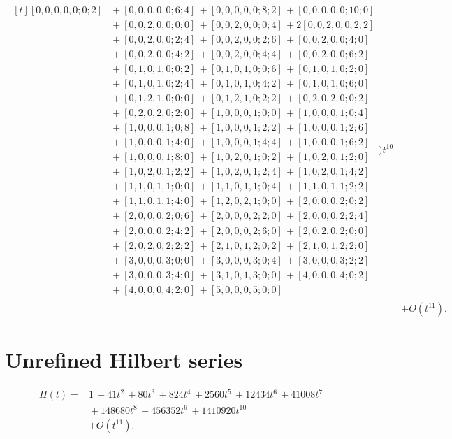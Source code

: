 \documentclass[10pt]{article}
\begin{document}
\[\begin{aligned}
\begin{aligned}[t][0,0,0,0,0;0;2]
  &{}+[0,0,0,0,0;6;4]\,+[0,0,0,0,0;8;2]\,+[0,0,0,0,0;10;0] \\
  &{}+[0,0,2,0,0;0;0]\,+[0,0,2,0,0;0;4]\,+2[0,0,2,0,0;2;2] \\
  &{}+[0,0,2,0,0;2;4]\,+[0,0,2,0,0;2;6]\,+[0,0,2,0,0;4;0] \\
  &{}+[0,0,2,0,0;4;2]\,+[0,0,2,0,0;4;4]\,+[0,0,2,0,0;6;2] \\
  &{}+[0,1,0,1,0;0;2]\,+[0,1,0,1,0;0;6]\,+[0,1,0,1,0;2;0] \\
  &{}+[0,1,0,1,0;2;4]\,+[0,1,0,1,0;4;2]\,+[0,1,0,1,0;6;0] \\
  &{}+[0,1,2,1,0;0;0]\,+[0,1,2,1,0;2;2]\,+[0,2,0,2,0;0;2] \\
  &{}+[0,2,0,2,0;2;0]\,+[1,0,0,0,1;0;0]\,+[1,0,0,0,1;0;4] \\
  &{}+[1,0,0,0,1;0;8]\,+[1,0,0,0,1;2;2]\,+[1,0,0,0,1;2;6] \\
  &{}+[1,0,0,0,1;4;0]\,+[1,0,0,0,1;4;4]\,+[1,0,0,0,1;6;2] \\
  &{}+[1,0,0,0,1;8;0]\,+[1,0,2,0,1;0;2]\,+[1,0,2,0,1;2;0] \\
  &{}+[1,0,2,0,1;2;2]\,+[1,0,2,0,1;2;4]\,+[1,0,2,0,1;4;2] \\
  &{}+[1,1,0,1,1;0;0]\,+[1,1,0,1,1;0;4]\,+[1,1,0,1,1;2;2] \\
  &{}+[1,1,0,1,1;4;0]\,+[1,2,0,2,1;0;0]\,+[2,0,0,0,2;0;2] \\
  &{}+[2,0,0,0,2;0;6]\,+[2,0,0,0,2;2;0]\,+[2,0,0,0,2;2;4] \\
  &{}+[2,0,0,0,2;4;2]\,+[2,0,0,0,2;6;0]\,+[2,0,2,0,2;0;0] \\
  &{}+[2,0,2,0,2;2;2]\,+[2,1,0,1,2;0;2]\,+[2,1,0,1,2;2;0] \\
  &{}+[3,0,0,0,3;0;0]\,+[3,0,0,0,3;0;4]\,+[3,0,0,0,3;2;2] \\
  &{}+[3,0,0,0,3;4;0]\,+[3,1,0,1,3;0;0]\,+[4,0,0,0,4;0;2] \\
  &{}+[4,0,0,0,4;2;0]\,+[5,0,0,0,5;0;0]\end{aligned}\Bigr)t^{10} \\
  &+ O(t^{11}).
\end{aligned}
\]


\section{Unrefined Hilbert series}
\[
\begin{aligned}
H(t) ={}& 1\,+41t^{2}\,+80t^{3}\,+824t^{4}\,+2560t^{5}\,+12434t^{6}\,+41008t^{7} \\
  &{}+148680t^{8}\,+456352t^{9}\,+1410920t^{10} \\
  &+ O(t^{11}).
\end{aligned}
\]
\end{document}
